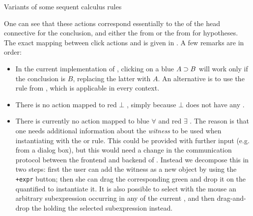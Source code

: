 \begin{scope}
\begin{marginfigure}
  \caption{Variants of some sequent calculus rules}
\end{marginfigure}

One can see that these actions correspond essentially to the  of the head connective for the conclusion, and either the
 from  or the  from
 for hypotheses. The exact mapping between click actions and
 is given in . A few remarks are in
order:
\begin{itemize}
  \item In the current implementation of , clicking on a blue
   $A \supset B$ will work only if the conclusion is $B$, replacing the
  latter with $A$. An alternative is to use the {} rule from
  , which is applicable in every context.
  
  \item There is no action mapped to red $\bot$ , simply because
  $\bot$ does not have any .

  \item There is currently no action mapped to blue $∀$ and red $∃$ .
  The reason is that one needs additional information about the \emph{witness}
  to be used when instantiating with the  or  rule.
  This could be provided with further input (e.g. from a dialog box), but this
  would need a change in the communication protocol between the frontend and
  backend of . Instead we decompose this in two steps: first the user
  can add the witness as a new object by using the \texttt{+expr} button; then
  she can drag the corresponding green  and drop it on the quantified
   to instantiate it. It is also possible to select with the mouse an
  arbitrary subexpression occurring in any  of the current ,
  and then drag-and-drop the  holding the selected subexpression
  instead.
\end{itemize}


\end{scope}
